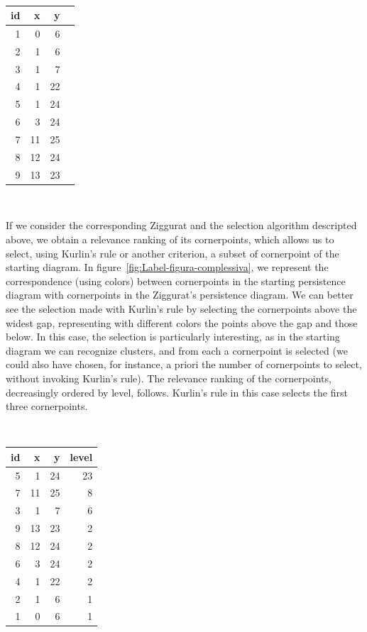 \documentclass[english, LaM, oneside, noexaminfo]{sapthesis}
\begin{document}
\

\begin{tabular}{rrrr}
\toprule
 id &  x &  y \\
\midrule
  1 &  0 &  6 \\
  2 &  1 &  6 \\
  3 &  1 &  7 \\
  4 &  1 & 22 \\
  5 &  1 & 24 \\
  6 &  3 & 24 \\
  7 & 11 & 25 \\
  8 & 12 & 24 \\
  9 & 13 & 23 \\
\bottomrule
\end{tabular}

\


If we consider the corresponding Ziggurat and the selection algorithm descripted above, we obtain a relevance ranking of its cornerpoints, which allows us to select, using Kurlin's rule or another criterion, a subset of cornerpoint of the starting diagram. In figure~\ref{fig:Label-figura-complessiva}, we represent the correspondence (using colors) between cornerpoints in the starting persistence diagram with cornerpoints in the Ziggurat's persistence diagram.
We can better see the selection made with Kurlin's rule by selecting the cornerpoints above the widest gap, representing with different colors the points above the gap and those below. In this case, the selection is particularly interesting, as in the starting diagram we can recognize clusters, and from each a cornerpoint is selected (we could also have chosen, for instance, a priori the number of cornerpoints to select, without invoking Kurlin's rule).
The relevance ranking of the cornerpoints,  decreasingly ordered by level, follows. Kurlin's rule in this case selects the first three cornerpoints.

\

\begin{tabular}{rrrr}
\toprule
 id &  x &  y &  level \\
\midrule
  5 &  1 & 24 &     23 \\
  7 & 11 & 25 &      8 \\
  3 &  1 &  7 &      6 \\
  9 & 13 & 23 &      2 \\
  8 & 12 & 24 &      2 \\
  6 &  3 & 24 &      2 \\
  4 &  1 & 22 &      2 \\
  2 &  1 &  6 &      1 \\
  1 &  0 &  6 &      1 \\
\bottomrule
\end{tabular}
\end{document}
